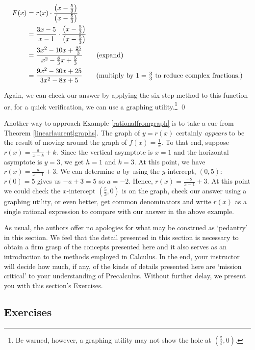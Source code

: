 \begin{ex}
\begin{align*}
F(x) & = r(x) \cdot \dfrac{\left(x - \frac{5}{3} \right)}{\left(x - \frac{5}{3} \right)} \\
     & = \dfrac{3x-5}{x-1} \cdot \dfrac{\left(x - \frac{5}{3} \right)}{\left(x - \frac{5}{3} \right)} \\
     & = \dfrac{3x^2-10x+\frac{25}{3}}{x^2 - \frac{8}{3} x + \frac{5}{3}} \tag{expand}\\
     & = \dfrac{9x^2-30x+25}{3x^2-8x+5} \tag{multiply by $1 = \frac{3}{3}$ to reduce complex fractions.}\\
\end{align*}

Again, we can check our answer by applying the six step method to this function or, for a quick verification, we can use a graphing utility.\footnote{Be warned, however, a graphing utility may not show the hole at  $\left(\frac{5}{3}, 0 \right)$.} \qed

\end{ex}

Another way to approach Example \ref{rationalfromgraph} is to take a cue from Theorem \ref{linearlaurentlgraphs}.  The graph of $y=r(x)$ certainly \textit{appears} to be the result of moving around the graph of $f(x) = \frac{1}{x}$.  To that end, suppose $r(x) = \frac{a}{x-k} + k$.  Since the vertical asymptote is $x=1$ and the horizontal asymptote is $y=3$, we get $h=1$ and $k=3$.  At this point, we have $r(x) = \frac{a}{x-1}+3$.  We can determine $a$ by using the $y$-intercept, $(0,5)$:  $r(0) =5$ gives us $-a+3 = 5$ so $a = -2$.  Hence, $r(x) = \frac{-2}{x-1}+3$.  At this point we could check the $x$-intercept  $\left(\frac{5}{3}, 0 \right)$ is on the graph, check our answer using a graphing utility, or even better, get common denominators and write $r(x)$ as a single rational expression to compare with our answer in the above example.  

As usual, the authors offer no apologies for what may be construed as `pedantry' in this section.  We feel that the detail presented in this section is necessary to obtain a firm grasp of the concepts presented here and it also serves as an introduction to the methods employed in Calculus. In the end,  your instructor will decide how much, if any, of the kinds of details presented here are `mission critical' to your understanding of Precalculus. Without further delay, we present you with this section's Exercises.

\clearpage

\subsection{Exercises}



\closegraphsfile